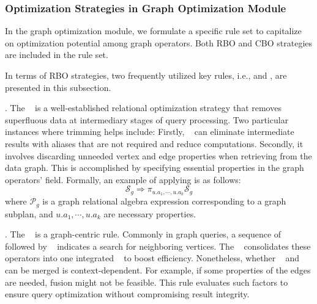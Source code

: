 \subsubsection{Optimization Strategies in Graph Optimization Module}

In the graph optimization module, we formulate a specific rule set to capitalize on optimization potential among graph operators. 
Both RBO and CBO strategies are included in the rule set.

In terms of RBO strategies, two frequently utilized key rules, i.e., \trimrule and \fusionrule, are presented in this subsection.

\trimrule. 
The \trimrule~ is a well-established relational optimization strategy that removes superfluous data at intermediary stages of query processing. 
Two particular instances where trimming helps include: 
Firstly, \trimrule~ can eliminate intermediate results with aliases that are not required and reduce computations.
Secondly, it involves discarding unneeded vertex and edge properties when retrieving from the data graph. 
This is accomplished by specifying essential properties in the graph operators’  field.
Formally, an example of applying \trimrule is as follows:
\begin{equation}
    \mathcal{S}_g \Rightarrow \pi_{u.a_1, \cdots, u.a_k}\mathcal{S} _g 
\end{equation}
where $\mathcal{P}_g$ is a graph relational algebra expression corresponding to a graph subplan, and $u.a_1, \cdots, u.a_k$ are necessary properties.


\fusionrule. 
The \fusionrule~ is a graph-centric rule. 
Commonly in graph queries, a sequence of \expandedge~ followed by \getvertex~ indicates a search for neighboring vertices. 
The \fusionrule~ consolidates these operators into one integrated \expandvertex~ to boost efficiency. 
Nonetheless, whether \expandedge~ and \getvertex~ can be merged is context-dependent. 
For example, if some properties of the edges are needed, fusion might not be feasible.
This rule evaluates such factors to ensure query optimization without compromising result integrity.


